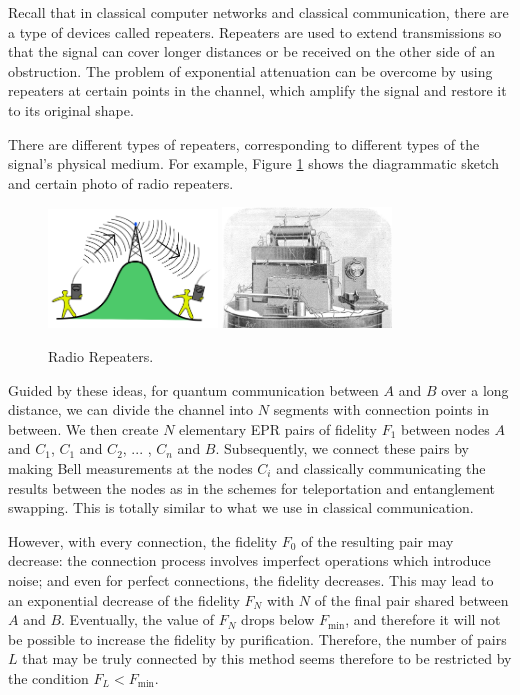 \documentclass[10pt]{article}
\begin{document}
Recall that in classical computer networks and classical communication, there are a type of devices called repeaters. Repeaters are used to extend transmissions so that the signal can cover longer distances or be received on the other side of an obstruction. The problem of exponential attenuation can be overcome by using repeaters at certain points in the channel, which amplify the signal and restore it to its original shape.

There are different types of repeaters, corresponding to different types of the signal's physical medium. For example, Figure \ref{repeater} shows the diagrammatic sketch and certain photo of radio repeaters.

\begin{figure}[htbp]
    \centering
    \includegraphics[width=0.4\textwidth]{figure/repeater.jpg}
    \includegraphics[width=0.4\textwidth]{figure/repeater2.jpg}
    \caption{Radio Repeaters.}
    \label{repeater}
\end{figure}

Guided by these ideas, for quantum communication between $A$ and $B$ over a long distance, we can divide the channel into $N$ segments with connection points in between. We then create $N$ elementary EPR pairs of fidelity $F_1$ between nodes $A$ and $C_1$, $C_1$ and $C_2$, ... , $C_n$ and $B$.  
Subsequently, we connect these pairs by making Bell measurements at the nodes $C_i$ and classically communicating the results between the nodes as in the schemes for teleportation\cite{vaidman1994teleportation} and entanglement swapping\cite{zukowski1993event}. This is totally similar to what we use in classical communication.

However, with every connection, the fidelity $F_0$ of the resulting pair may decrease: the connection process involves imperfect operations which introduce noise; and even for perfect connections, the fidelity decreases.
This may lead to an exponential decrease of the fidelity $F_N$ with $N$ of the final pair shared between $A$ and $B$. Eventually, the value of $F_N$ drops below $F_{\min}$, and therefore it will not be possible to increase the fidelity by purification. Therefore, the number of pairs $L$ that may be truly connected by this method seems therefore to be restricted by the condition $F_L<F_{\min}$.
\end{document}
